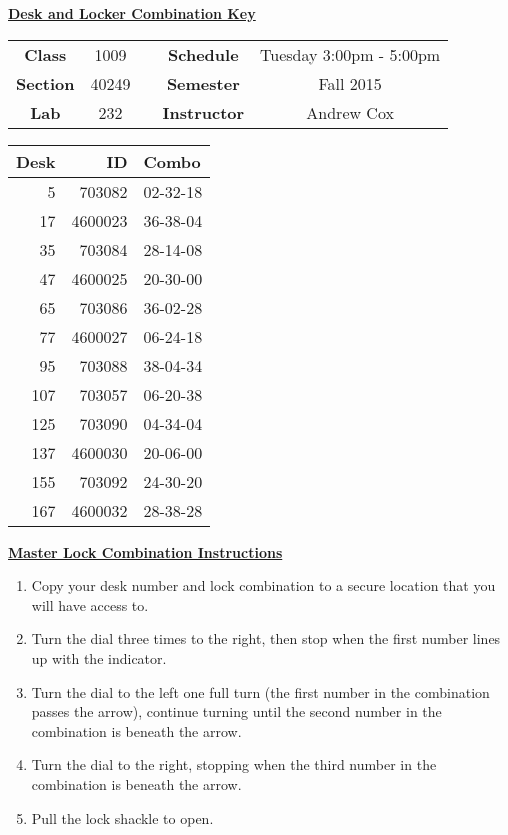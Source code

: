 \documentclass[12pt]{article}
\begin{document}
\thispagestyle{empty}

\begin{center}
	{\huge\textbf{\underline{ Desk and Locker Combination Key}}}
\end{center}


\begin{table}[h]
  \centering
  \begin{tabular}{ccccc}

  \textbf{Class} & 1009 & {\qquad} &\textbf{Schedule} & Tuesday 3:00pm - 5:00pm \\
  \textbf{Section} & 40249 & {\qquad} & \textbf{Semester} & Fall 2015 \\
  \textbf{Lab} & 232 & {\qquad} & \textbf{Instructor} & Andrew Cox \\
  \end{tabular}
\end{table}
 \vspace{0.5in}
\begin{minipage}{0.4\textwidth}

\begin{tabular}{rrl}
\toprule
 Desk &       ID &     Combo \\
\midrule
    5 &   703082 &  02-32-18 \\
   17 &  4600023 &  36-38-04 \\
   35 &   703084 &  28-14-08 \\
   47 &  4600025 &  20-30-00 \\
   65 &   703086 &  36-02-28 \\
   77 &  4600027 &  06-24-18 \\
   95 &   703088 &  38-04-34 \\
  107 &   703057 &  06-20-38 \\
  125 &   703090 &  04-34-04 \\
  137 &  4600030 &  20-06-00 \\
  155 &   703092 &  24-30-20 \\
  167 &  4600032 &  28-38-28 \\
\bottomrule
\end{tabular}


\end{minipage}
\begin{minipage}{0.4\textwidth}
\underline{{\large \textbf{Master Lock Combination Instructions}}}
\begin{enumerate}
\item Copy your desk number and lock combination to a secure location that you will have access to.
\item Turn the dial three times to the right, then stop when the first number lines up with the indicator.
\item Turn the dial to the left one full turn (the first number in the combination passes the arrow), continue turning until the second number in the combination is beneath the arrow.
\item Turn the dial to the right, stopping when the third number in the combination is beneath the arrow.
\item Pull the lock shackle to open.
\end{enumerate}
\end{minipage}
\end{document}
